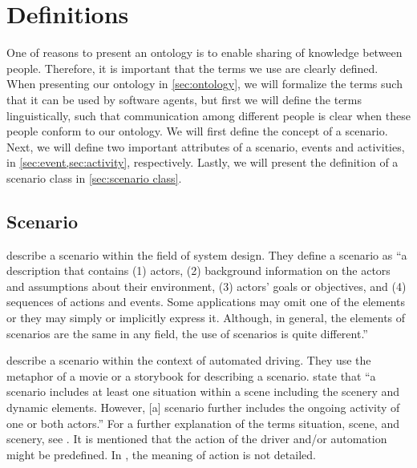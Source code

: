 \section{Definitions}
\label{sec:definitions}

\cbstart
One of reasons to present an ontology is to enable sharing of knowledge between people. Therefore, it is important that the terms we use are clearly defined. When presenting our ontology in \cref{sec:ontology}, we will formalize the terms such that it can be used by software agents, but first we will define the terms linguistically, such that communication among different people is clear when these people conform to our ontology. We will first define the concept of a scenario. Next, we will define two important attributes of a scenario, events and activities, in \cref{sec:event,sec:activity}, respectively. Lastly, we will present the definition of a scenario class in \cref{sec:scenario class}.
\cbend



\subsection{Scenario}
\label{sec:scenario}

\textcite{go2004blind} describe a scenario within the field of system design. They define a scenario as ``a description that contains (1) actors, (2) background information on the actors and assumptions about their environment, (3) actors' goals or objectives, and (4) sequences of actions and events. Some applications may omit one of the elements or they may simply or implicitly express it. Although, in general, the elements of scenarios are the same in any field, the use of scenarios is quite different.'' 

\textcite{geyer2014} describe a scenario within the context of automated driving. They use the metaphor of a movie or a storybook for describing a scenario. \textcite{geyer2014} state that ``a scenario includes at least one situation within a scene including the scenery and dynamic elements. However, [a] scenario further includes the ongoing activity of one or both actors.'' For a further explanation of the terms situation, scene, and scenery, see \cite{geyer2014}. It is mentioned that the action of the driver and/or automation might be predefined. In \cite{geyer2014}, the meaning of action is not detailed.

